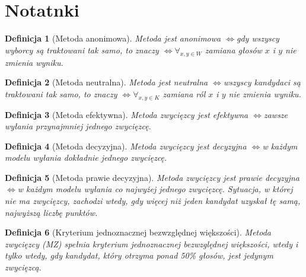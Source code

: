\documentclass[12pt,a4paper]{article}
\theoremstyle{break}
\newtheorem{definition}{Definicja}[section]
\newcommand{\witw}{$\Leftrightarrow$}
\begin{document}
	\section{Notatnki}
	\begin{definition}[Metoda anonimowa]
		Metoda jest anonimowa \witw gdy wszyscy wyborcy są traktowani tak samo, to znaczy \witw $\forall_{x,y \in W}$ zamiana głosów $x$ i $y$ nie zmienia wyniku.
	\end{definition}
	
	\begin{definition}[Metoda neutralna]
		Metoda jest neutralna \witw wszyscy kandydaci są traktowani tak samo, to znaczy \witw $\forall_{x,y \in K}$ zamiana ról $x$ i $y$ nie zmienia wyniku.
	\end{definition}

	\begin{definition}[Metoda efektywna]
		Metoda zwycięzcy jest efektywna \witw zawsze wyłania przynajmniej jednego zwycięzcę.
	\end{definition}

	\begin{definition}[Metoda decyzyjna]
		Metoda zwycięzcy jest decyzyjna \witw w każdym modelu wyłania dokładnie jednego zwycięzcę.
	\end{definition}
	
	\begin{definition}[Metoda prawie decyzyjna]
		Metoda zwycięzcy jest prawie decyzyjna \witw w każdym modelu wyłania co najwyżej jednego zwycięzcę. Sytuacja, w której nie ma zwycięzcy, zachodzi wtedy, gdy więcej niż jeden kandydat uzyskał tę samą, najwyższą liczbę punktów.
	\end{definition}

	\begin{definition}[Kryterium jednoznacznej bezwzględnej większości]
		Metoda zwycięzcy (MZ) spełnia kryterium jednoznacznej bezwzględnej większości, \textit{wtedy i tylko wtedy}, gdy kandydat, który otrzyma ponad 50\% głosów, jest jedynym zwycięzcą.
	\end{definition}
\end{document}
